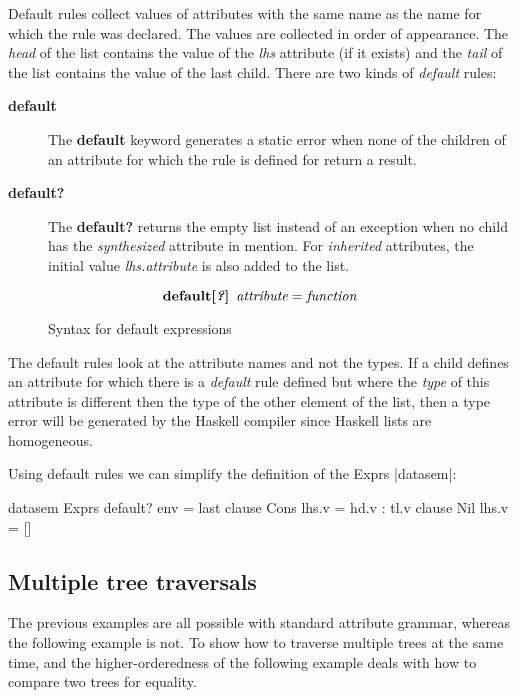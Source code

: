 Default rules collect values of attributes with the same name as the name for which the rule was declared. The values are collected in order of appearance. The \emph{head} of the list contains the value of the \emph{lhs} attribute (if it exists) and the \emph{tail} of the list contains the value of the last child. There are two kinds of \emph{default} rules:
\begin{description}
\item[\textbf{default}] { The \textbf{default} keyword generates a static error when none of the children of an attribute for which the rule is defined for return a result. }
\item[\textbf{default?}] { The \textbf{default?} returns the empty list instead of an exception when no child has the \emph{synthesized} attribute in mention. For \emph{inherited} attributes, the initial value \emph{lhs.attribute} is also added to the list. }
\end{description}

\begin{figure}[h!]
\[
\textbf{default[\textit{?}]} \hspace{5pt} \emph{attribute} = \emph{function}
\]
\caption{Syntax for default expressions}
\label{default:syntax}
\end{figure}

The default rules look at the attribute names and not the types. If a child defines an attribute for which there is a \emph{default} rule defined but where the \emph{type} of this attribute is different then the type of the other element of the list, then a type error will be generated by the Haskell compiler since Haskell lists are homogeneous.

Using default rules we can simplify the definition of the Exprs |datasem|:

\begin{code}
datasem Exprs
   default? env = last
   clause Cons
     lhs.v = hd.v : tl.v
   clause Nil
     lhs.v = []
\end{code}

\subsection{Multiple tree traversals}
The previous examples are all possible with standard attribute grammar, whereas the following example is not. To show how to traverse multiple trees at the same time, and the higher-orderedness of \rcore the following example deals with how to compare two trees for equality.

